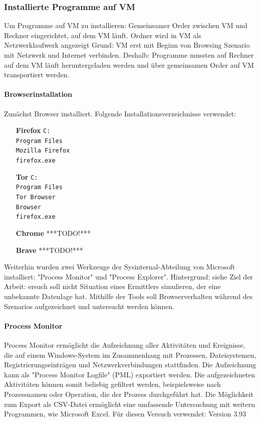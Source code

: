 \subsubsection*{Installierte Programme auf VM}
Um Programme auf VM zu installieren: Gemeinsamer Order zwischen VM und Rechner eingerichtet, auf dem VM läuft. Ordner wird in VM als Netzwerklaufwerk angezeigt
Grund: VM erst mit Beginn von Browsing Szenario mit Netzwerk und Internet verbinden. Deshalb: Programme mussten auf Rechner auf dem VM läuft heruntergeladen werden und über gemeinsamen Order auf VM transportiert werden.

\paragraph*{Browserinstallation}
Zunächst Browser installiert. Folgende Installationsverzeichnisse verwendet:
\begin{enumerate}
\item[\textbf{Firefox}] \texttt{C:\\Program Files\\Mozilla Firefox\\firefox.exe}
\item[\textbf{Tor}] \texttt{C:\\Program Files\\Tor Browser\\Browser\\firefox.exe}
\item[\textbf{Chrome}] ***TODO!***
\item[\textbf{Brave}] ***TODO!***
\end{enumerate}

Weiterhin wurden zwei Werkzeuge der Sysinternal-Abteilung von Microsoft installiert: "Process Monitor" und "Process Explorer". 
Hintergrund: siehe Ziel der Arbeit: ersuch soll nicht Situation eines Ermittlers simulieren, der eine unbekannte Datenlage hat. Mithilfe der Tools soll Browserverhalten während des Szenarios aufgezeichnet und untersucht werden können.

\paragraph*{Process Monitor}
Process Monitor ermöglicht die Aufzeichnung aller Aktivitäten und Ereignisse, die auf einem Windows-System im Zusammenhang mit Prozessen, Dateisystemen, Registrierungseinträgen und Netzwerkverbindungen stattfinden. Die Aufzeichnung kann als "Process Monitor Logfile" (PML) exportiert werden. Die aufgezeichneten Aktivitäten können somit beliebig gefiltert werden, beispielsweise nach Prozessnamen oder Operation, die der Prozess durchgeführt hat. Die Möglichkeit zum Export als CSV-Datei ermöglicht eine umfassende Untersuchung mit weitern Programmen, wie Microsoft Excel.
Für diesen Versuch verwendet: Version 3.93

